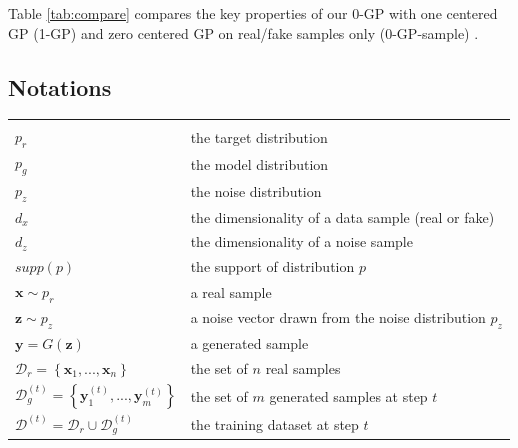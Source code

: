 \documentclass{article} %
\begin{document}
Table \ref{tab:compare} compares the key properties of our 0-GP with one centered GP (1-GP) \citep{wgangp} and zero centered GP on real/fake samples only (0-GP-sample) \citep{whichGANConverge}.

\subsection*{Notations}

\begin{tabular}{ll}
\hline \\
$p_r$ & the target distribution \\
$p_g$ & the model distribution \\
$p_z$ & the noise distribution \\
$d_x$ & the dimensionality of a data sample (real or fake) \\
$d_z$ & the dimensionality of a noise sample \\
$supp(p)$ & the support of distribution $p$ \\
$\bm x \sim p_r$ & a real sample \\
$\bm z \sim p_z$ & a noise vector drawn from the noise distribution $p_z$ \\ 
$\bm{y} = G(\bm z)$ & a generated sample \\
$\mathcal{D}_r = \left\lbrace \bm{x}_1, ..., \bm x_n \right\rbrace$ & the set of $n$ real samples \\
$\mathcal{D}_g^{(t)} = \left\lbrace \bm{y}_1^{(t)}, ..., \bm y_m^{(t)} \right\rbrace$ & the set of $m$ generated samples at step $t$ \\ 
$\mathcal{D}^{(t)} = \mathcal{D}_r \cup \mathcal{D}_g^{(t)}$ & the training dataset at step $t$ \\
\hline
\end{tabular}
\end{document}
